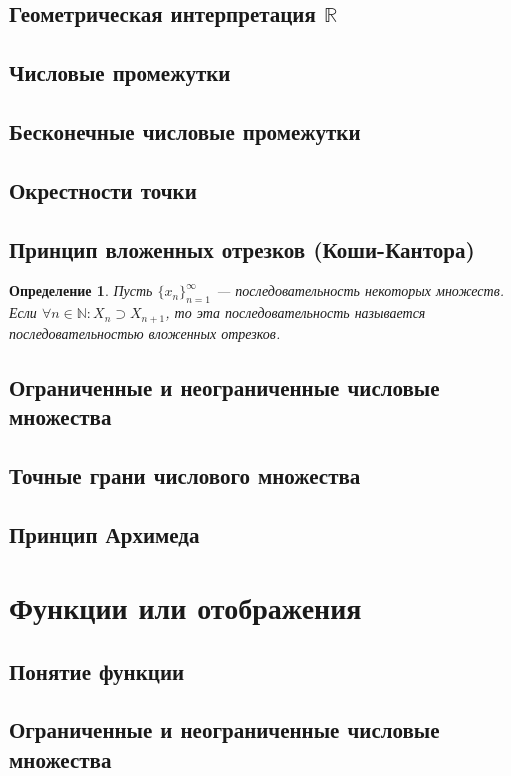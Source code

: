 \documentclass[a4paper,12pt]{article} %
\newtheorem{definition}{Определение}[subsection]
\theoremstyle{remark}
\begin{document}
\subsection{Геометрическая интерпретация $\mathbb{R}$}
\subsection{Числовые промежутки}
\subsection{Бесконечные числовые промежутки}
\subsection{Окрестности точки}
\subsection{Принцип вложенных отрезков (Коши-Кантора)}
\begin{definition}
	Пусть $\{x_n\}_{n=1}^{\infty}$ --- последовательность некоторых множеств. Если $\forall n\in \mathbb{N}:X_n\supset X_{n+1}$, то эта последовательность называется последовательностью вложенных отрезков.
\end{definition}

\subsection{Ограниченные и неограниченные числовые множества}
\subsection{Точные грани числового множества}
\subsection{Принцип Архимеда}


\section{Функции или отображения}
\subsection{Понятие функции}
\subsection{Ограниченные и неограниченные числовые множества}
\end{document}
